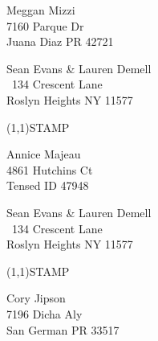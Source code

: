 \documentclass[12pt]{article}
\begin{document}
\begin{center} \begin{Huge} \vspace*{\fill}
Meggan Mizzi\\
7160 Parque Dr\\
Juana Diaz PR 42721\\
\vspace{\fill} \end{Huge} \end{center}

\clearpage

\begin{minipage}{.5\linewidth} \noindent
Sean Evans \& Lauren Demell\\\ 
134 Crescent Lane\\ 
Roslyn Heights NY 11577
\end{minipage}
\begin{minipage}{.5\linewidth \hspace{-.2in} \vspace{-.3in}}
\begin{flushright}
\framebox(1,1){STAMP}
\end{flushright}
\end{minipage}

\begin{center} \begin{Huge} \vspace*{\fill}
Annice Majeau\\
4861 Hutchins Ct\\
Tensed ID 47948\\
\vspace{\fill} \end{Huge} \end{center}

\clearpage

\begin{minipage}{.5\linewidth} \noindent
Sean Evans \& Lauren Demell\\\ 
134 Crescent Lane\\ 
Roslyn Heights NY 11577
\end{minipage}
\begin{minipage}{.5\linewidth \hspace{-.2in} \vspace{-.3in}}
\begin{flushright}
\framebox(1,1){STAMP}
\end{flushright}
\end{minipage}

\begin{center} \begin{Huge} \vspace*{\fill}
Cory Jipson\\
7196 Dicha Aly\\
San German PR 33517\\
\vspace{\fill} \end{Huge} \end{center}
\end{document}
